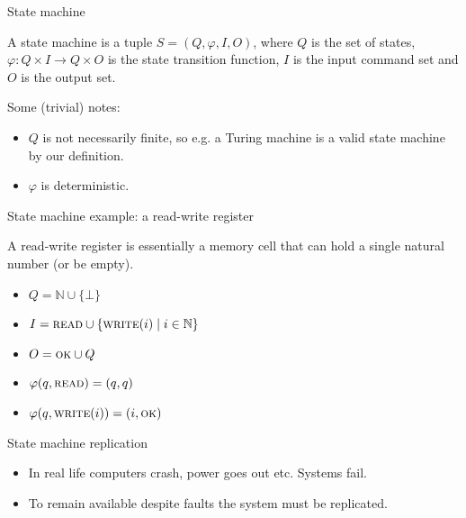 \documentclass{beamer}
\begin{document}
\begin{frame}{State machine}
  \begin{definition}
    A state machine is a tuple $S = (Q, \varphi, I, O)$, where $Q$ is the set of states, $\varphi\colon Q \times I \to Q \times O$ is the state transition function, $I$ is the input command set and $O$ is the output set.
  \end{definition}
  Some (trivial) notes:
  \begin{itemize}
  \item $Q$ is not necessarily finite, so e.g. a Turing machine is a valid state machine by our definition.
  \item $\varphi$ is deterministic.
  \end{itemize}
\end{frame}

\begin{frame}{State machine example: a read-write register}
  \begin{definition}
    A read-write register is essentially a memory cell that can hold a single natural number (or be empty).
    \begin{itemize}
      \item $Q = \mathbb{N} \cup \{ \bot \}$
      \item $I = \textsc{read} \cup \{ \textsc{write}(i) \mid i \in \mathbb{N} \}$
      \item $O = \textsc{ok} \cup Q$
      \item $\varphi(q, \textsc{read}) = (q, q)$
      \item $\varphi(q, \textsc{write}(i)) = (i, \textsc{ok})$
    \end{itemize}
  \end{definition}
\end{frame}


\begin{frame}{State machine replication}
  \begin{itemize}
    \item In real life computers crash, power goes out etc. Systems fail.
    \item To remain available despite faults the system must be replicated.
  \end{itemize}
\end{frame}
\end{document}

